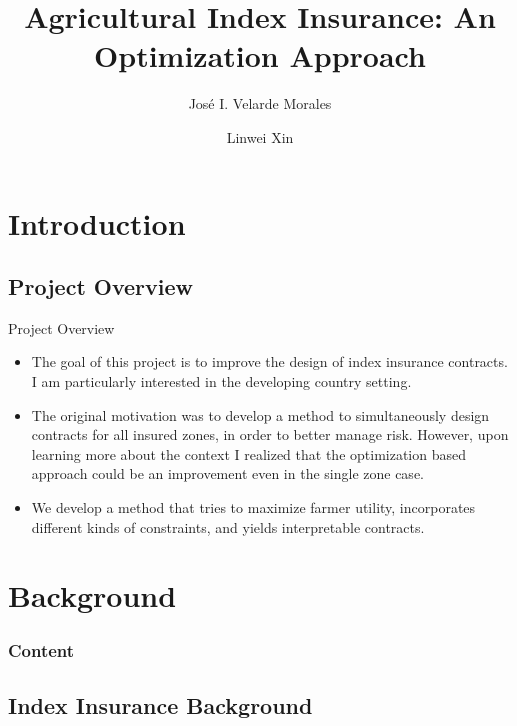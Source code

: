 \documentclass{beamer}
\title[Agricultural Index Insurance]{Agricultural Index Insurance: An Optimization Approach}
\author[José Velarde Morales]{José I. Velarde Morales \and Linwei Xin}
\institute[Chicago Booth]
{

  University of Chicago\\
  Booth School of Business

}
\begin{document}
\beamertemplatenavigationsymbolsempty
\frame{\titlepage}
\section{Introduction}


\subsection*{Project Overview}
\begin{frame}{Project Overview}
 \begin{itemize}
    \setlength\itemsep{1em}   
    \item The goal of this project is to improve the design of index insurance contracts. I am particularly interested in the developing country setting.  
    \item The original motivation was to develop a method to simultaneously design contracts for all insured zones, in order to better manage risk. However, upon learning more about the context I realized that the optimization based approach could be an improvement even in the single zone case. 
    \item We develop a method that tries to maximize farmer utility, incorporates different kinds of constraints, and yields interpretable contracts. 
 \end{itemize}
\end{frame}

\section{Background}
\begin{frame}
    \frametitle{Content}
    \tableofcontents[currentsection]
  \end{frame}
\subsection{Index Insurance Background}
\end{document}
